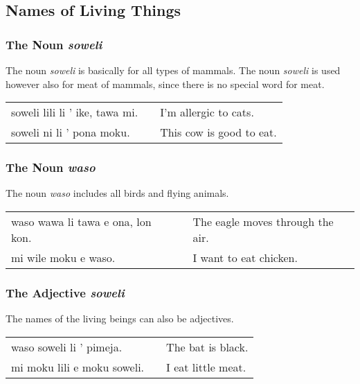 \subsection*{Names of Living Things}
%
\subsubsection*{The Noun \textit{soweli}}
%
%
The noun \textit{soweli} is basically for all types of mammals. 
The noun \textit{soweli} is used however also for meat of mammals, since there is no special word for meat.

\begin{supertabular}{p{5,5cm}|ll}
soweli lili li ' ike, tawa mi. && I'm allergic to cats. \\
soweli ni li ' pona moku. && This cow is good to eat. \\
\end{supertabular} 

%
\subsubsection*{The Noun \textit{waso}}
%
%
The noun \textit{waso} includes all birds and flying animals. 

\begin{supertabular}{p{5,5cm}|ll}
waso wawa li tawa e ona, lon kon. && The eagle moves through the air. \\
mi wile moku e waso. && I want to eat chicken. \\
\end{supertabular} 

%
\subsubsection*{The Adjective \textit{soweli}}
%
%
The names of the living beings can also be adjectives. 

\begin{supertabular}{p{5,5cm}|ll}
waso soweli li ' pimeja. && The bat is black. \\
mi moku lili e moku soweli. && I eat little meat. \\
\end{supertabular} 

